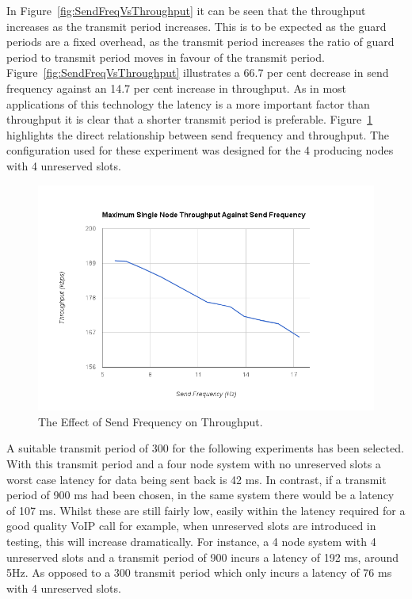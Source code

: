 \documentclass[parskip]{cs4rep}
\begin{document}
In Figure~\ref{fig:SendFreqVsThroughput} it can be seen that the throughput increases as the transmit period increases. This is to be expected as the guard periods are a fixed overhead, as the transmit period increases the ratio of guard period to transmit period moves in favour of the transmit period. Figure~\ref{fig:SendFreqVsThroughput} illustrates a 66.7 per cent decrease in send frequency against an 14.7 per cent increase in throughput. As in most applications of this technology the latency is a more important factor than throughput it is clear that a shorter transmit period is preferable. Figure~\ref{fig:ThroughputVsSendFreq} highlights the direct relationship between send frequency and throughput. The configuration used for these experiment was designed for the 4 producing nodes with 4 unreserved slots.

\begin{figure}
	\centering
	\includegraphics[width=120mm]{throughputvssendfreq.png}
	\caption{The Effect of Send Frequency on Throughput.}
	\label{fig:ThroughputVsSendFreq}
\end{figure}

A suitable transmit period of 300 for the following experiments has been selected. With this transmit period and a four node system with no unreserved slots a worst case latency for data being sent back is 42 ms. In contrast, if a transmit period of 900 ms had been chosen, in the same system there would be a latency of 107 ms. Whilst these are still fairly low, easily within the latency required for a good quality VoIP call for example, when unreserved slots are introduced in testing, this will increase dramatically. For instance, a 4 node system with 4 unreserved slots and a transmit period of 900 incurs a latency of 192 ms, around 5Hz. As opposed to a 300 transmit period which only incurs a latency of 76 ms with 4 unreserved slots.
\end{document}
